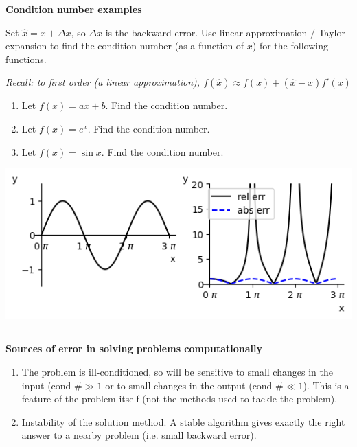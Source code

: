 \documentclass[12pt,letterpaper,noanswers]{exam}
\begin{document}
\noindent \textbf{Condition number examples}

Set $\hat{x} = x+ \Delta x$, so $\Delta x$ is the backward error.  Use linear approximation / Taylor expansion to find the condition number (as a function of $x$) for the following functions.

\emph{Recall: to first order (a linear approximation), $f(\hat{x}) \approx f(x) + (\hat{x} - x)f'(x)$}

\begin{enumerate}
    \item   Let $f(x) = ax + b$.  Find the condition number.
    \vspace{0.5in}
    
    \item Let $f(x) = e^x$.  Find the condition number.
        \vspace{1in}
    
     \item Let $f(x) = \sin x$.  Find the condition number.
         \vspace{1in}

\end{enumerate}

\includegraphics{img/C01sin.png}

\vspace{0.2cm}
\hrule
\vspace{0.2cm}

\noindent \textbf{Sources of error in solving problems computationally}
\begin{tcolorbox}
\begin{enumerate}
\itemsep0pt
    \item The problem is ill-conditioned, so will be sensitive to small changes in the input ($\text{cond }\# \gg 1$ or to small changes in the output ($\text{cond }\# \ll 1$).  This is a feature of the problem itself (not the methods used to tackle the problem).
    \item Instability of the solution method.  A stable algorithm gives exactly the right answer to a nearby problem (i.e. small backward error).
    
\end{enumerate}
\end{tcolorbox}
\end{document}
